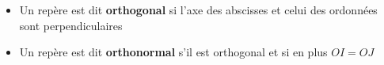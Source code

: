 \begin{itemize}
\item Un repère est dit \textbf{orthogonal} si l'axe des abscisses et celui des ordonnées sont perpendiculaires
\item Un repère est dit \textbf{orthonormal} s'il est orthogonal et si en plus $OI=OJ$
\end{itemize}


